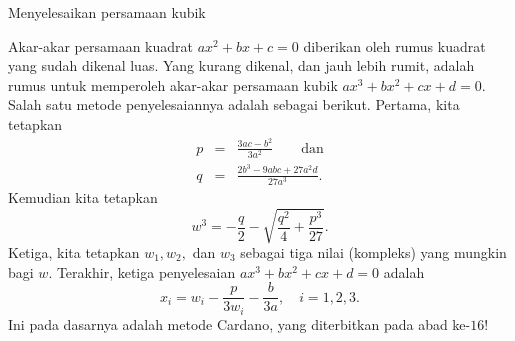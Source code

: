 \noindent\begin{digression}{Menyelesaikan persamaan kubik}  

\noindent Akar-akar persamaan kuadrat $ax^{2}+bx+c=0$ diberikan oleh
rumus kuadrat yang sudah dikenal luas. Yang kurang dikenal, dan jauh
lebih rumit, adalah rumus untuk memperoleh akar-akar 
persamaan kubik $ax^{3}+bx^{2}+cx+d=0$. Salah satu metode penyelesaiannya
adalah sebagai berikut. Pertama, kita tetapkan
\begin{eqnarray*}
p & = & \frac{3ac-b^{2}}{3a^{2}}\qquad\mbox{dan}\\
q & = & \frac{2b^{3}-9abc+27a^{2}d}{27a^{3}}.
\end{eqnarray*}
Kemudian kita tetapkan 
\[
w^{3}=-\frac{q}{2}-\sqrt{\frac{q^{2}}{4}+\frac{p^{3}}{27}}.
\]
Ketiga, kita tetapkan $w_{1},w_{2},$ dan $w_{3}$ sebagai tiga nilai
(kompleks) yang mungkin bagi $w$. Terakhir, ketiga penyelesaian $ax^{3}+bx^{2}+cx+d=0$
adalah 
\[
x_{i}=w_{i}-\frac{p}{3w_{i}}-\frac{b}{3a},\quad i=1,2,3.
\]
Ini pada dasarnya adalah metode  Cardano,
yang diterbitkan pada abad ke-$16$!


\end{digression}
